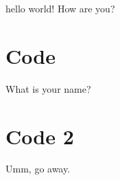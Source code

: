 \documentclass{article}
\begin{document}
    hello world!
    How are you?
    \section{Code}
    What is your name?
    \section{Code 2}
    Umm, go away.
\end{document}
